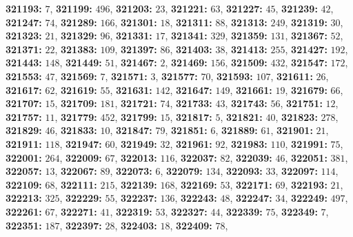 \textsf{\bfseries 321193:} $7$, \textsf{\bfseries 321199:} $496$, \textsf{\bfseries 321203:} $23$, \textsf{\bfseries 321221:} $63$, \textsf{\bfseries 321227:} $45$, \textsf{\bfseries 321239:} $42$, \textsf{\bfseries 321247:} $74$, \textsf{\bfseries 321289:} $166$, \textsf{\bfseries 321301:} $18$, \textsf{\bfseries 321311:} $88$, \textsf{\bfseries 321313:} $249$, \textsf{\bfseries 321319:} $30$, \textsf{\bfseries 321323:} $21$, \textsf{\bfseries 321329:} $96$, \textsf{\bfseries 321331:} $17$, \textsf{\bfseries 321341:} $329$, \textsf{\bfseries 321359:} $131$, \textsf{\bfseries 321367:} $52$, \textsf{\bfseries 321371:} $22$, \textsf{\bfseries 321383:} $109$, \textsf{\bfseries 321397:} $86$, \textsf{\bfseries 321403:} $38$, \textsf{\bfseries 321413:} $255$, \textsf{\bfseries 321427:} $192$, \textsf{\bfseries 321443:} $148$, \textsf{\bfseries 321449:} $51$, \textsf{\bfseries 321467:} $2$, \textsf{\bfseries 321469:} $156$, \textsf{\bfseries 321509:} $432$, \textsf{\bfseries 321547:} $172$, \textsf{\bfseries 321553:} $47$, \textsf{\bfseries 321569:} $7$, \textsf{\bfseries 321571:} $3$, \textsf{\bfseries 321577:} $70$, \textsf{\bfseries 321593:} $107$, \textsf{\bfseries 321611:} $26$, \textsf{\bfseries 321617:} $62$, \textsf{\bfseries 321619:} $55$, \textsf{\bfseries 321631:} $142$, \textsf{\bfseries 321647:} $149$, \textsf{\bfseries 321661:} $19$, \textsf{\bfseries 321679:} $66$, \textsf{\bfseries 321707:} $15$, \textsf{\bfseries 321709:} $181$, \textsf{\bfseries 321721:} $74$, \textsf{\bfseries 321733:} $43$, \textsf{\bfseries 321743:} $56$, \textsf{\bfseries 321751:} $12$, \textsf{\bfseries 321757:} $11$, \textsf{\bfseries 321779:} $452$, \textsf{\bfseries 321799:} $15$, \textsf{\bfseries 321817:} $5$, \textsf{\bfseries 321821:} $40$, \textsf{\bfseries 321823:} $278$, \textsf{\bfseries 321829:} $46$, \textsf{\bfseries 321833:} $10$, \textsf{\bfseries 321847:} $79$, \textsf{\bfseries 321851:} $6$, \textsf{\bfseries 321889:} $61$, \textsf{\bfseries 321901:} $21$, \textsf{\bfseries 321911:} $118$, \textsf{\bfseries 321947:} $60$, \textsf{\bfseries 321949:} $32$, \textsf{\bfseries 321961:} $92$, \textsf{\bfseries 321983:} $110$, \textsf{\bfseries 321991:} $75$, \textsf{\bfseries 322001:} $264$, \textsf{\bfseries 322009:} $67$, \textsf{\bfseries 322013:} $116$, \textsf{\bfseries 322037:} $82$, \textsf{\bfseries 322039:} $46$, \textsf{\bfseries 322051:} $381$, \textsf{\bfseries 322057:} $13$, \textsf{\bfseries 322067:} $89$, \textsf{\bfseries 322073:} $6$, \textsf{\bfseries 322079:} $134$, \textsf{\bfseries 322093:} $33$, \textsf{\bfseries 322097:} $114$, \textsf{\bfseries 322109:} $68$, \textsf{\bfseries 322111:} $215$, \textsf{\bfseries 322139:} $168$, \textsf{\bfseries 322169:} $53$, \textsf{\bfseries 322171:} $69$, \textsf{\bfseries 322193:} $21$, \textsf{\bfseries 322213:} $325$, \textsf{\bfseries 322229:} $55$, \textsf{\bfseries 322237:} $136$, \textsf{\bfseries 322243:} $48$, \textsf{\bfseries 322247:} $34$, \textsf{\bfseries 322249:} $497$, \textsf{\bfseries 322261:} $67$, \textsf{\bfseries 322271:} $41$, \textsf{\bfseries 322319:} $53$, \textsf{\bfseries 322327:} $44$, \textsf{\bfseries 322339:} $75$, \textsf{\bfseries 322349:} $7$, \textsf{\bfseries 322351:} $187$, \textsf{\bfseries 322397:} $28$, \textsf{\bfseries 322403:} $18$, \textsf{\bfseries 322409:} $78$, 
